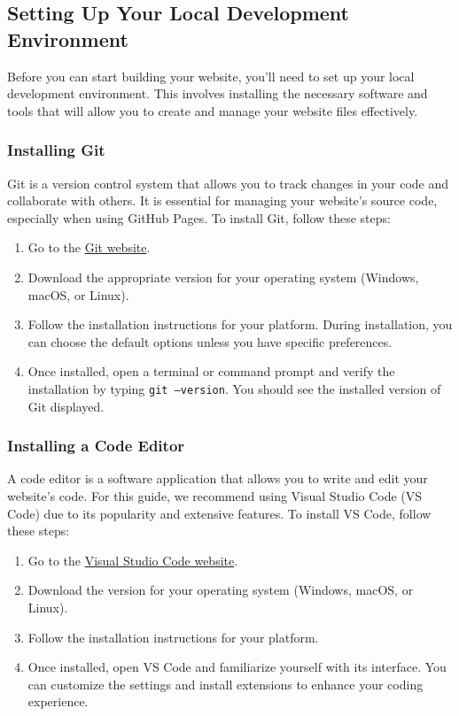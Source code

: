 \subsection{Setting Up Your Local Development Environment}

Before you can start building your website, you'll need to set up your local development environment. This involves installing the necessary software and tools that will allow you to create and manage your website files effectively.

\subsubsection{Installing Git}
Git is a version control system that allows you to track changes in your code and collaborate with others. It is essential for managing your website's source code, especially when using GitHub Pages. To install Git, follow these steps:
\begin{enumerate}
    \item Go to the \href{https://git-scm.com/downloads}{Git website}.
    \item Download the appropriate version for your operating system (Windows, macOS, or Linux).
    \item Follow the installation instructions for your platform. During installation, you can choose the default options unless you have specific preferences.
    \item Once installed, open a terminal or command prompt and verify the installation by typing \texttt{git --version}. You should see the installed version of Git displayed.
\end{enumerate}

\subsubsection{Installing a Code Editor}
A code editor is a software application that allows you to write and edit your website's code. For this guide, we recommend using Visual Studio Code (VS Code) due to its popularity and extensive features. To install VS Code, follow these steps:
\begin{enumerate}
    \item Go to the \href{https://code.visualstudio.com/}{Visual Studio Code website}.
    \item Download the version for your operating system (Windows, macOS, or Linux).
    \item Follow the installation instructions for your platform.
    \item Once installed, open VS Code and familiarize yourself with its interface. You can customize the settings and install extensions to enhance your coding experience.
\end{enumerate}

